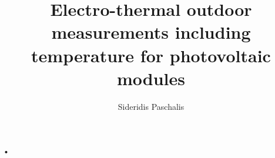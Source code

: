 \documentclass[11pt,a4paper]{book}
\author{Sideridis Paschalis}
\title{Electro-thermal outdoor measurements including temperature for photovoltaic modules}
\begin{document}
•
\end{document}
